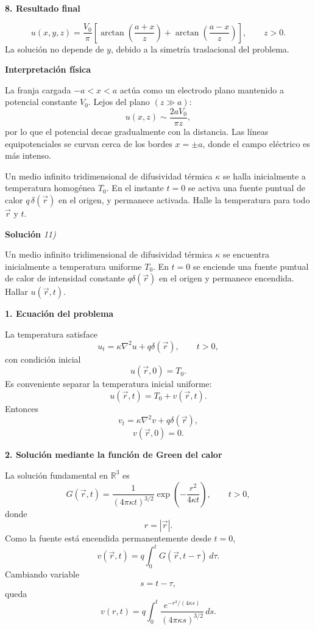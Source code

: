 \documentclass[11pt,spanish]{article}
\newcounter{problema}
\newcommand{\prob}{\stepcounter{problema} \vspace{.5cm} \noindent{\bf Problema \arabic{problema}: }}
\begin{document}
{\bf 8. Resultado final}

$$
\boxed{
u(x,y,z)
=
\frac{V_0}{\pi}
\left[
\arctan\left(\frac{a+x}{z}\right)
+
\arctan\left(\frac{a-x}{z}\right)
\right],
\qquad z>0.
}
$$
La solución no depende de $y$, debido a la simetría traslacional del problema.

{\bf Interpretación física}

La franja cargada $-a<x<a$ actúa como un electrodo plano mantenido a potencial constante $V_0$.
Lejos del plano $(z\gg a)$:
$$
u(x,z)\sim \frac{2aV_0}{\pi z},
$$
por lo que el potencial decae gradualmente con la distancia.
Las líneas equipotenciales se curvan cerca de los bordes $x=\pm a$, donde el campo eléctrico es más intenso.






\prob Un medio infinito tridimensional de difusividad térmica \(\kappa\) se halla inicialmente a temperatura homogénea \(T_0\). En el instante \(t=0\) se activa una fuente puntual de calor \(q\,\delta(\vec{r})\) en el origen, y permanece activada. Halle la temperatura para todo \(\vec{r}\) y \(t\).

\vspace{0.5cm}
{\bf Soluci\'on }{\em 11)}
\vspace{0.5cm}

Un medio infinito tridimensional de difusividad térmica $\kappa$ se encuentra inicialmente a temperatura uniforme $T_0$. En $t=0$ se enciende una fuente puntual de calor de intensidad constante $q\delta(\vec r)$ en el origen y permanece encendida. Hallar $u(\vec r,t)$. 

{\bf 1. Ecuación del problema}

La temperatura satisface
$$
u_t=\kappa\nabla^2u+q\delta(\vec r),
\qquad t>0,
$$
con condición inicial
$$
u(\vec r,0)=T_0.
$$
Es conveniente separar la temperatura inicial uniforme:
$$
u(\vec r,t)=T_0+v(\vec r,t).
$$
Entonces
$$
v_t=\kappa\nabla^2v+q\delta(\vec r),
$$
$$
v(\vec r,0)=0.
$$

{\bf 2. Solución mediante la función de Green del calor}

La solución fundamental en $\mathbb R^3$ es
$$
G(\vec r,t)
=
\frac{1}{(4\pi\kappa t)^{3/2}}
\exp\left(
-\frac{r^2}{4\kappa t}
\right),
\qquad t>0,
$$
donde
$$
r=|\vec r|.
$$
Como la fuente está encendida permanentemente desde $t=0$,
$$
v(\vec r,t)
=
q\int_0^t
G(\vec r,t-\tau)\,d\tau.
$$
Cambiando variable
$$
s=t-\tau,
$$
queda
$$
\boxed{
v(r,t)
=
q
\int_0^t
\frac{e^{-r^2/(4\kappa s)}}{(4\pi\kappa s)^{3/2}}
\,ds.
}
$$
\end{document}
